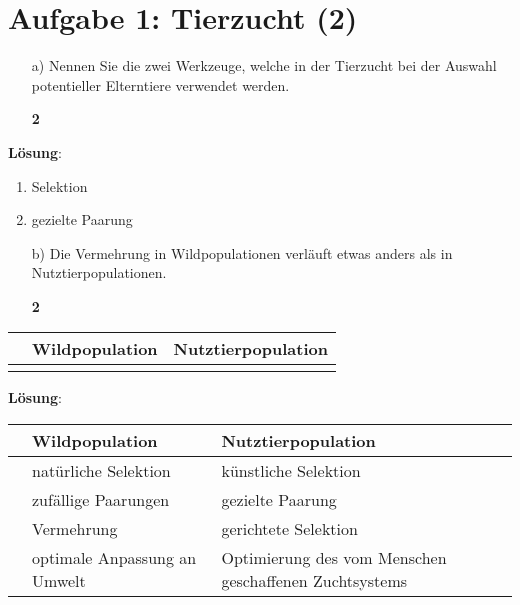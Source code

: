 \documentclass{scrartcl}
\newcommand{\points}[1]
{\begin{flushright}\textbf{#1}\end{flushright}}
\newcommand{\sol}
{\textbf{L\"osung}:}
\begin{document}
\clearpage
\pagebreak

\section*{Aufgabe 1: Tierzucht (2)}
\begin{enumerate}
\item[a)] Nennen Sie die zwei Werkzeuge, welche in der Tierzucht bei der Auswahl potentieller Elterntiere verwendet werden.
\points{2}
\end{enumerate}

\sol

\begin{enumerate}
\item Selektion
\item gezielte Paarung
\end{enumerate}

\clearpage
\pagebreak

\begin{enumerate}
\item[b)] Die Vermehrung in Wildpopulationen verl\"auft etwas anders als in Nutztierpopulationen.
\points{2}
\end{enumerate}

\begin{center}
\begin{tabular}{|p{3cm}|p{5cm}|p{5cm}|}
\hline
  &  Wildpopulation  &  Nutztierpopulation \\
\hline
  &                  & \\
\hline
\end{tabular}
\end{center}

\sol

\begin{center}
\begin{tabular}{|p{3cm}|p{5cm}|p{5cm}|}
\hline
  &  Wildpopulation         &  Nutztierpopulation \\
\hline
  & nat\"urliche Selektion  &  k\"unstliche Selektion \\
\hline
  & zufällige Paarungen     &  gezielte Paarung \\
\hline
  & Vermehrung              &  gerichtete Selektion \\
\hline
  & optimale Anpassung an Umwelt  &  Optimierung des vom Menschen geschaffenen Zuchtsystems
\end{tabular}
\end{center}

\clearpage
\pagebreak
\end{document}
